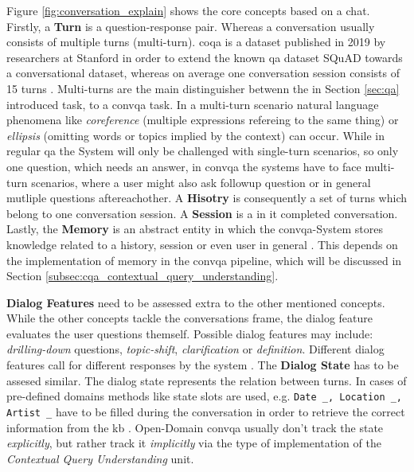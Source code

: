Figure \ref{fig:conversation_explain} shows the core concepts based on a chat. Firstly, a \textbf{Turn} is a question-response pair. Whereas a conversation usually consists of multiple turns (multi-turn). \gls{coqa} is a dataset published in 2019 by researchers at Stanford in order to extend the known \gls{qa} dataset SQuAD towards a conversational dataset, whereas on average one conversation session consists of 15 turns \cite{reddy_coqa_2018}. Multi-turns are the main distinguisher betwenn the in Section \ref{sec:qa} introduced task, to a \gls{convqa} task. In a multi-turn scenario natural language phenomena like \textit{coreference} (multiple expressions refereing to the same thing) or \textit{ellipsis} (omitting words or topics implied by the context) can occur. While in regular \gls{qa} the System will only be challenged with single-turn scenarios, so only one question, which needs an answer, in \gls{convqa} the systems have to face multi-turn scenarios, where a user might also ask followup question or in general mutliple questions aftereachother. A \textbf{Hisotry} is consequently a set of turns which belong to one conversation session. A \textbf{Session} is a in it completed conversation. Lastly, the \textbf{Memory} is an abstract entity in which the \gls{convqa}-System stores knowledge related to a history, session or even user in general \cite{zamani_conversational_2023,gao_neural_2022}. This depends on the implementation of memory in the \gls{convqa} pipeline, which will be discussed in Section \ref{subsec:cqa_contextual_query_understanding}.

\textbf{Dialog Features} need to be assessed extra to the other mentioned concepts. While the other concepts tackle the conversations frame, the dialog feature evaluates the user questions themself. Possible dialog features may include: \textit{drilling-down} questions, \textit{topic-shift}, \textit{clarification} or \textit{definition}. Different dialog features call for different responses by the system \cite{gupta_conversational_2020}. The \textbf{Dialog State} has to be assesed similar. The dialog state represents the relation between turns. In cases of pre-defined domains methods like state slots are used, e.g. \verb |Date _, Location _, Artist _| have to be filled during the conversation in order to retrieve the correct information from the \gls{kb} \cite{rastogi_schema-guided_2020}. Open-Domain \gls{convqa} usually don't track the state \textit{explicitly}, but rather track it \textit{implicitly} via the type of implementation of the \textit{Contextual Query Understanding} unit.


